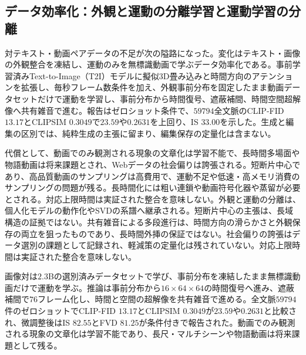 \documentclass[lualatex,a4paper,10pt]{jlreq}
\begin{document}
\subsection{データ効率化：外観と運動の分離学習と運動学習の分離}
対テキスト・動画ペアデータの不足が次の隘路になった\autocite{btd073}。変化はテキスト・画像の外観整合を凍結し、運動のみを無標識動画で学ぶデータ効率化である\autocite{btd073}。事前学習済みText-to-Image（T2I）モデルに擬似3D畳み込みと時間方向のアテンションを拡張し、毎秒フレーム数条件を加え、外観事前分布を固定したまま動画データセットだけで運動を学習し、事前分布から時間復号、遮蔽補間、時間空間超解像へ共有雑音で進む\autocite{btd073}。報告はゼロショット条件で、$59794$全文脈のCLIP-FID $13.17$とCLIPSIM $0.3049$で$23.59$や$0.2631$を上回り、IS $33.00$を示した\autocite{btd073}。生成と編集の区別では、純粋生成の主張に留まり、編集保存の定量化は含まない\autocite{btd073}。

代償として、動画でのみ観測される現象の文章化は学習不能で、長時間多場面や物語動画は将来課題とされ、Webデータの社会偏りは誇張される\autocite{btd073}。短断片中心であり、高品質動画のサンプリングは高費用で、運動不足や低速・高メモリ消費のサンプリングの問題が残る\autocite{btd073}。長時間化には粗い連鎖や動画符号化器や蒸留が必要とされる\autocite{btd073}。対応上限時間は実証された整合を意味しない\autocite{btd073}。外観と運動の分離は、個人化モデルの動作化やSVDの系譜へ継承される\autocite{btd073,btd074,btd075}。短断片中心の主張は、長域構造の証拠ではない\autocite{btd073}。共有雑音による多段進行は、時間方向の滑らかさと外観保存の両立を狙ったものであり、長時間外挿の保証ではない\autocite{btd073}。社会偏りの誇張はデータ選別の課題として記録され、軽減策の定量化は残されていない\autocite{btd073}。対応上限時間は実証された整合を意味しない\autocite{btd073}。

画像対は$2.3$Bの選別済みデータセットで学び、事前分布を凍結したまま無標識動画だけで運動を学ぶ\autocite{btd073}。推論は事前分布から$16 \times 64 \times 64$の時間復号へ進み、遮蔽補間で$76$フレーム化し、時間と空間の超解像を共有雑音で進める\autocite{btd073}。全文脈$59794$件のゼロショットでCLIP-FID $13.17$とCLIPSIM $0.3049$が$23.59$や$0.2631$と比較され、微調整後はIS $82.55$とFVD $81.25$が条件付きで報告された\autocite{btd073}。動画でのみ観測される現象の文章化は学習不能であり、長尺・マルチシーンや物語動画は将来課題として残る\autocite{btd073}。
\end{document}
